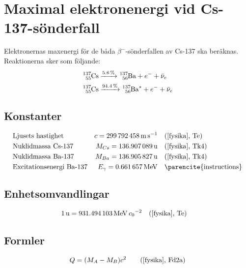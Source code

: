 \section{Maximal elektronenergi vid Cs-137-sönderfall} \label{sec:energy}

Elektronernas maxenergi för de båda $\beta^-$-sönderfallen av Cs-137 ska
beräknas. Reaktionerna sker som följande:
%
\begin{align}
    \ce{^137_55Cs} &\xrightarrow{\qty{5.6}{\percent}}  \ce{^137_56Ba} + e^- + \bar{\nu}_e   \label{csdecay1} \\
    \ce{^137_55Cs} &\xrightarrow{\qty{94.4}{\percent}} \ce{^137_56Ba^*} + e^- + \bar{\nu}_e \label{csdecay2}
\end{align}

\subsection*{Konstanter}

\begin{align*}
    & \text{Ljusets hastighet}        & c        = \qty{299792458}{\m\per\s}         &\quad \fysika{Te}  \\
    & \text{Nuklidmassa Cs-137}       & M_{Cs}   = \qty{136.907089}{\atomicmassunit} &\quad \fysika{Tk4} \\
    & \text{Nuklidmassa Ba-137}       & M_{Ba}   = \qty{136.905827}{\atomicmassunit} &\quad \fysika{Tk4} \\
    & \text{Excitationsenergi Ba-137} & E_\gamma = \qty{0.661657}{\MeV}              &\quad \text{\parencite{instructions}}
\end{align*}

\subsection*{Enhetsomvandlingar}

\begin{align*}
    & \qty{1}{\atomicmassunit} = \qty{931.494103}{\MeV\per\clight\squared} \quad \fysika{Te}
\end{align*}

\subsection*{Formler}

\begin{align}
    Q &= (M_A - M_B)c^2 &\quad \fysika{Fd2a} \label{freed}
\end{align}

